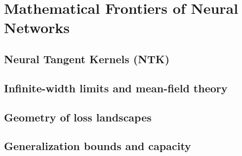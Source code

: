 ﻿\chapter{Mathematical Frontiers of Neural Networks}
\section{Neural Tangent Kernels (NTK)}

\section{Infinite-width limits and mean-field theory}

\section{Geometry of loss landscapes}

\section{Generalization bounds and capacity}


